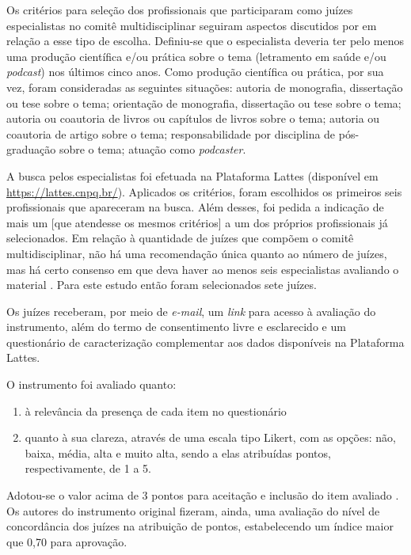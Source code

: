 Os critérios para seleção dos profissionais que participaram como juízes especialistas no comitê multidisciplinar seguiram aspectos discutidos por \textcite{alexandre2011} em relação a esse tipo de escolha. Definiu-se que o especialista deveria ter pelo menos uma produção científica e/ou prática sobre o tema (letramento em saúde e/ou \textit{podcast}) nos últimos cinco anos. Como produção científica ou prática, por sua vez, foram consideradas as seguintes situações: autoria de monografia, dissertação ou tese sobre o tema; orientação de monografia, dissertação ou tese sobre o tema; autoria ou coautoria de livros ou capítulos de livros sobre o tema; autoria ou coautoria de artigo sobre o tema; responsabilidade por disciplina de pós-graduação sobre o tema; atuação como \textit{podcaster}.

A busca pelos especialistas foi efetuada na Plataforma Lattes (disponível em \url{https://lattes.cnpq.br/}). Aplicados os critérios, foram escolhidos os primeiros seis profissionais que apareceram na busca. Além desses, foi pedida a indicação de mais um [que atendesse os mesmos critérios] a um dos próprios profissionais já selecionados. Em relação à quantidade de juízes que compõem o comitê multidisciplinar, não há uma recomendação única quanto ao número de juízes, mas há certo consenso em que deva haver ao menos seis especialistas avaliando o material \cite{pasquali2010}. Para este estudo então foram selecionados sete juízes. 

Os juízes receberam, por meio de \textit{e-mail}, um \textit{link} para acesso à avaliação do instrumento, além do termo de consentimento livre e esclarecido e um questionário de caracterização complementar aos dados disponíveis na Plataforma Lattes.

O instrumento foi avaliado quanto: 
\begin{enumerate}[label=(\alph*)]
	\item à relevância da presença de cada item no questionário
	\item quanto à sua clareza, através de uma escala tipo Likert, com as opções: não, baixa, média, alta e muito alta, sendo a elas atribuídas pontos, respectivamente, de 1 a 5.
\end{enumerate}

Adotou-se o valor acima de 3 pontos para aceitação e inclusão do item avaliado \cite{alarcon2020}. Os autores do instrumento original fizeram, ainda, uma avaliação do nível de concordância dos juízes na atribuição de pontos, estabelecendo um índice maior que 0,70 para aprovação.
